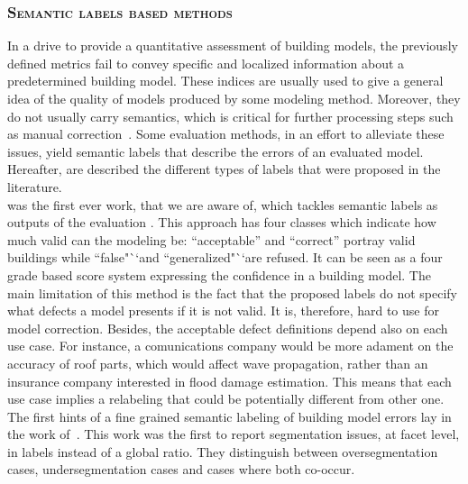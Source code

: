        \subsubsection{\textsc{Semantic labels based methods}}
            \label{subsec::state_of_the_art::quality::output::semantic}
            In a drive to provide a quantitative assessment of building models, the previously defined metrics fail to convey specific and localized information about a predetermined building model.
            These indices are usually used to give a general idea of the quality of models produced by some modeling method.
            Moreover, they do not usually carry semantics, which is critical for further processing steps such as manual correction~\parencite{elberink2011quality}.
            Some evaluation methods, in an effort to alleviate these issues, yield semantic labels that describe the errors of an evaluated model.
            Hereafter, are described the different types of labels that were proposed in the literature.\\

            \parencite{boudet2006supervised} was the first ever work, that we are aware of, which tackles semantic labels as outputs of the evaluation .
            This approach has four classes which indicate how much valid can the modeling be: ``acceptable'' and ``correct'' portray valid buildings while ``false"``and ``generalized"``are refused.
            It can be seen as a four grade based score system expressing the confidence in a building model.
            The main limitation of this method is the fact that the proposed labels do not specify what defects a model presents if it is not valid.
            It is, therefore, hard to use for model correction.
            Besides, the acceptable defect definitions depend also on each use case.
            For instance, a comunications company would be more adament on the accuracy of roof parts, which would affect wave propagation, rather than an insurance company interested in flood damage estimation.
            This means that each use case implies a relabeling that could be potentially different from other one.\\
            
            The first hints of a fine grained semantic labeling of building model errors lay in the work of~\textcite{rottensteiner2014results}.
            This work was the first to report segmentation issues, at facet level, in labels instead of a global ratio.
            They distinguish between oversegmentation cases, undersegmentation cases and cases where both co-occur.\\

